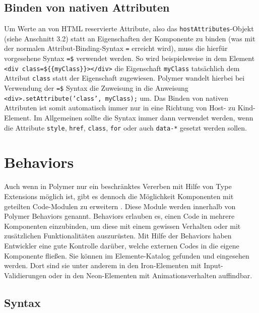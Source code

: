 \subsection{Binden von nativen Attributen}\label{binden-von-nativen-attributen}

Um Werte an von \ac{HTML} reservierte Attribute, also das \texttt{hostAttributes}-Objekt (siehe Anschnitt 3.2) statt an Eigenschaften der Komponente zu binden (was mit der normalen Attribut-Binding-Syntax \texttt{=} erreicht wird), muss die hierfür vorgesehene Syntax \texttt{=\$} verwendet werden. So wird beispielsweise in dem Element \texttt{\textless{}div\ class=\$\dq \{\{myClass\}\}\dq\textgreater{}\textless{}/div\textgreater{}} die Eigenschaft \texttt{myClass} tatsächlich dem Attribut \texttt{class} statt der Eigenschaft zugewiesen. Polymer wandelt hierbei bei Verwendung der \texttt{=\$} Syntax die Zuweisung in die Anweisung \texttt{\textless{}div\textgreater{}.setAttribute('class',\ myClass);} um. Das Binden von nativen Attributen ist somit automatisch immer nur in eine Richtung von Host- zu Kind-Element. Im Allgemeinen sollte die Syntax immer dann verwendet werden, wenn die Attribute \texttt{style}, \texttt{href}, \texttt{class}, \texttt{for} oder auch \texttt{data-*} gesetzt werden sollen.


\section{Behaviors}\label{behaviors}

Auch wenn in Polymer nur ein beschränktes Vererben mit Hilfe von Type Extensions möglich ist, gibt es dennoch die Möglichkeit Komponenten mit geteilten Code-Modulen zu erweitern \cite{citeulike:13915080}. Diese Module werden innerhalb von Polymer Behaviors genannt. Behaviors erlauben es, einen Code in mehrere Komponenten einzubinden, um diese mit einem gewissen Verhalten oder mit zusätzlichen Funktionalitäten auszurüsten. Mit Hilfe der Behaviors haben Entwickler eine gute Kontrolle darüber, welche externen Codes in die eigene Komponente fließen. Sie können im Elemente-Katalog gefunden und eingesehen werden. Dort sind sie unter anderem in den Iron-Elementen mit Input-Validierungen oder in den Neon-Elementen mit Animationsverhalten auffindbar.


\subsection{Syntax}\label{syntax}


